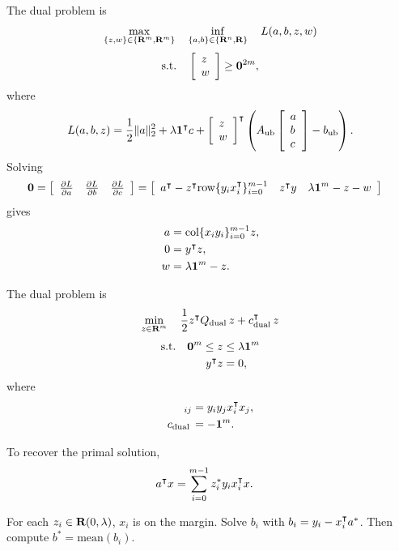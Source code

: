 \documentclass{article}
\begin{document}
    The dual problem is 
    \begin{align*}
        \max_{\{z,w\}\in\{\textbf{R}^m,\textbf{R}^m\}}\quad \inf_{\{a,b\}\in\{\textbf{R}^n,\textbf{R}\}}\quad L(a,b,z,w)
    \end{align*}
    \begin{align*}
        \text{s.t.}\quad \left[\begin{array}{lllllllllllllllllll}z\\w\end{array}\right]\geq \textbf{0}^{2m},
    \end{align*}
    where
    \begin{align*}
        L(a,b,z) = \frac{1}{2}\|a\|_2^2+\lambda \textbf{1}^\intercal c + \left[\begin{array}{lllllllllllllllllll}z\\w\end{array}\right]^\intercal \left(A_{\text{ub}} \left[\begin{array}{lllllllllllllllllll}a\\ b\\c\end{array}\right]-b_{\text{ub}} \right).
    \end{align*}
    Solving
    \begin{align*}
        \textbf{0}=\left[\begin{array}{lllllllllllllllllll}\frac{\partial L}{\partial a} & \frac{\partial L}{\partial b} & \frac{\partial L}{\partial c}\end{array}\right]
        &=\left[\begin{array}{lllllllllllllllllll}a^\intercal-z^\intercal \text{row}\{y_ix_i^\intercal\}_{i=0}^{m-1} & z^\intercal y & \lambda\textbf{1}^m-z-w\end{array}\right]
    \end{align*}
    gives
    \begin{align*}
        a&= \text{col}\{x_iy_i\}_{i=0}^{m-1}  z,\\
        0&= y^\intercal z,\\
        w&=\lambda\textbf{1}^m-z.
    \end{align*}

    The dual problem is \cite[p.~316]{ml}
    \begin{align*}
        \min_{z\in\textbf{R}^m}\quad \frac{1}{2}z^\intercal Q_{\text{dual}\:} z+c_{\text{dual}\:}^\intercal z
    \end{align*}
    \begin{align*}
        \text{s.t.}\quad \textbf{0}^m\leq z &\leq \lambda \textbf{1}^m\\
        y^\intercal z &=0,
    \end{align*}
    where
    \begin{align*}
        [Q_{\text{dual}\:}]_{ij}
        &=y_i y_j x_i^\tp x_j, \\
        c_{\text{dual}\:}&=-\ones^m.
    \end{align*}

    To recover the primal solution,
    \begin{align*}
        a^\intercal x &= \sum_{i=0}^{m-1} z_i^* y_i x_i^\intercal x.
    \end{align*}

    For each $z_i\in\textbf{R}(0,\lambda)$, $x_i$ is on the margin. Solve $b_i$ with $b_i=y_i-x_i^\intercal a^*$.
    Then compute $b^*=\text{mean}(b_i)$.
\end{document}
